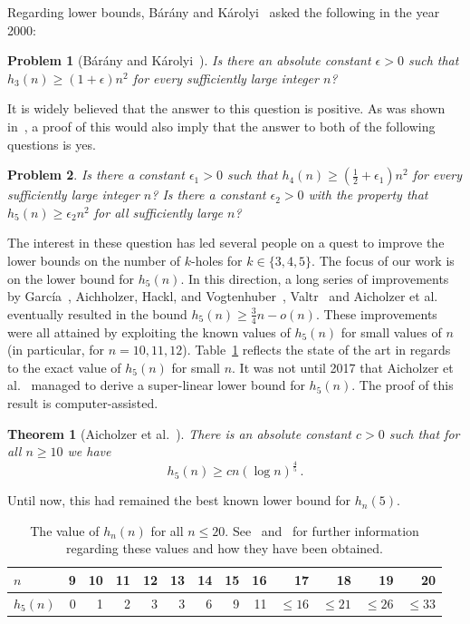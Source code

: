 \documentclass[12pt,reqno, a4paper]{amsart}
\newcounter{contSect} \numberwithin{contSect}{section}
\newtheorem{theorem}[contSect]{Theorem}
\newtheorem{problem}{Problem}
\begin{document}
Regarding lower bounds, Bárány and Károlyi~\cite{barany2000problems} asked the following in the year 2000:

\begin{problem}[Bárány and Károlyi~\cite{barany2000problems}]
    Is there an absolute constant $\epsilon >0$ such that $h_3(n)\geq (1+\epsilon)n^2$ for every sufficiently large integer $n$?
\end{problem}

It is widely believed that the answer to this question is positive. As was shown in~\cite{pinchasi2004empty}, a proof of this would also imply that the answer to both of the following questions is yes.

\begin{problem}
    Is there a constant $\epsilon_1>0$ such that $h_4(n)\geq \left(\frac{1}{2}+\epsilon_1\right)n^2$ for every sufficiently large integer $n$? Is there a constant $\epsilon_2>0$ with the property that $h_5(n)\geq \epsilon_2 n^2$ for all sufficiently large $n$?
\end{problem}

The interest in these question has led several people on a quest to improve the lower bounds on the number of $k$-holes for $k\in\{3,4,5\}$. The focus of our work is on the lower bound for $h_5(n)$. In this direction, a long series of improvements by García~\cite{garcia2011note,Garcia2012}, Aichholzer, Hackl, and Vogtenhuber~\cite{aichholzer20115}, Valtr~\cite{10.5555/2523693.2523699} and Aicholzer et al.~\cite{AICHHOLZER2014605} eventually resulted in the bound $h_5(n)\geq \frac{3}{4}n-o(n)$. These improvements were all attained by exploiting the known values of $h_5(n)$ for small values of $n$ (in particular, for $n=10,11,12$). Table~\ref{table:5-holes} reflects the state of the art in regards to the exact value of $h_5(n)$ for small $n$. It was not until 2017 that Aicholzer et al.~\cite{aichholzer2020superlinear} managed to derive a super-linear lower bound for $h_5(n)$. The proof of this result is computer-assisted. 

\begin{theorem}[Aicholzer et al.~\cite{aichholzer2020superlinear}]\label{thm:aich}
    There is an absolute constant $c>0$ such that for all $n\geq 10$ we have \[h_5(n)\geq cn(\log n)^{\frac{4}{5}}\,.\]
\end{theorem}

Until now, this had remained the best known lower bound for $h_n(5)$.

\begin{table}[h]
\begin{tabular}{rrrrrrrrrrrrr}
\multicolumn{1}{l|}{$n$}       & 9 & 10 & 11 & 12 & 13 & 14 & 15 & 16 & 17       & 18        & 19        & 20        \\ \hline
\multicolumn{1}{l|}{ $h_5(n)$ } & 0 & 1  & 2  & 3  & 3  & 6  & 9  & 11 & $\leq16$ & $\leq 21$ & $\leq 26$ & $\leq 33$
\end{tabular}
\caption{The value of $h_n(n)$ for all $n\leq 20$. See~\cite{scheucher2013counting} and~\cite{aichholzer2020superlinear} for further information regarding these values and how they have been obtained.}
\label{table:5-holes}
\end{table}
\end{document}
